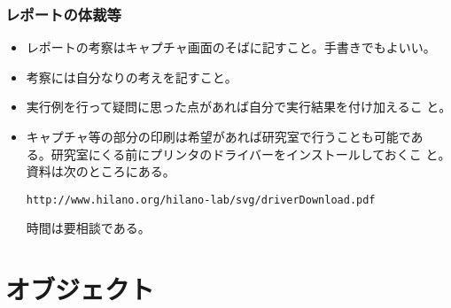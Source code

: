 \begin{frame}[containsverbatim]
 \frametitle{レポートの体裁等}
 \begin{itemize}
  \item レポートの考察はキャプチャ画面のそばに記すこと。手書きでもよいい。
  \item 考察には自分なりの考えを記すこと。
  \item 実行例を行って疑問に思った点があれば自分で実行結果を付け加えるこ
        と。
  \item キャプチャ等の部分の印刷は希望があれば研究室で行うことも可能であ
        る。研究室にくる前にプリンタのドライバーをインストールしておくこ
        と。資料は次のところにある。

        {\small
        \texttt{http://www.hilano.org/hilano-lab/svg/driverDownload.pdf}}

        時間は要相談である。
 \end{itemize}
\end{frame}
\section{オブジェクト}
